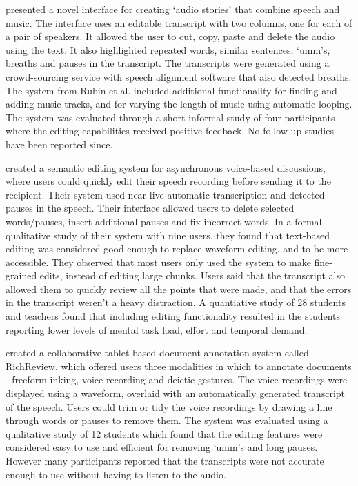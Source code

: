 \citet{Rubin2013} presented a novel interface for creating `audio stories' that combine speech and music. The interface
uses an editable transcript with two columns, one for each of a pair of speakers.  It allowed the user to cut, copy,
paste and delete the audio using the text. It also highlighted repeated words, similar sentences, `umm's, breaths and
pauses in the transcript. The transcripts were generated using a crowd-sourcing service with speech alignment software
that also detected breaths.  The system from Rubin et al. included additional functionality for finding and adding
music tracks, and for varying the length of music using automatic looping. The system was evaluated through a short
informal study of four participants where the editing capabilities received positive feedback. No follow-up studies
have been reported since.

\citet{Sivaraman2016} created a semantic editing system for asynchronous voice-based discussions, where users could
quickly edit their speech recording before sending it to the recipient.  Their system used near-live automatic
transcription and detected pauses in the speech. Their interface allowed users to delete selected words/pauses, insert
additional pauses and fix incorrect words.  In a formal qualitative study of their system with nine users, they found
that text-based editing was considered good enough to replace waveform editing, and to be more accessible. They
observed that most users only used the system to make fine-grained edits, instead of editing large chunks.  Users said
that the transcript also allowed them to quickly review all the points that were made, and that the errors in the
transcript weren't a heavy distraction. A quantiative study of 28 students and teachers found that
including editing functionality resulted in the students reporting lower levels of mental task load, effort and
temporal demand.

\citet{Yoon2014} created a collaborative tablet-based document annotation system called RichReview, which offered users
three modalities in which to annotate documents - freeform inking, voice recording and deictic gestures. The voice
recordings were displayed using a waveform, overlaid with an automatically generated transcript of the speech.
Users could trim or tidy the voice recordings by drawing a line through words or pauses to remove them.
The system was evaluated using a qualitative study of 12 students which found that the editing features were
considered easy to use and efficient for removing `umm's and long pauses.
However many participants reported that the transcripts were not accurate enough to use without having to listen to
the audio.

